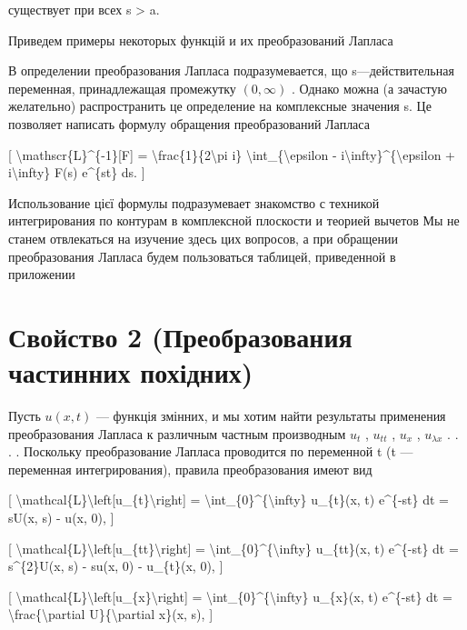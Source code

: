 \documentclass[
]{article}
\begin{document}
существует при всех s \textgreater{} a.

Приведем примеры некоторых функцій и их преобразований Лапласа

В определении преобразования Лапласа подразумевается, що
s---действительная переменная, принадлежащая промежутку \((0, \infty)\)
. Однако можна (а зачастую желательно) распространить це определение на
комплексные значения s. Це позволяет написать формулу обращения
преобразований Лапласа

{[} \textbackslash mathscr\{L\}\^{}\{-1\}{[}F{]} =
\textbackslash frac\{1\}\{2\textbackslash pi i\}
\textbackslash int\_\{\textbackslash epsilon -
i\textbackslash infty\}\^{}\{\textbackslash epsilon +
i\textbackslash infty\} F(s) e\^{}\{st\} ds. {]}

Использование цієї формулы подразумевает знакомство с техникой
интегрирования по контурам в комплексной плоскости и теорией вычетов Мы
не станем отвлекаться на изучение здесь цих вопросов, а при обращении
преобразования Лапласа будем пользоваться таблицей, приведенной в
приложении

\section{Свойство 2 (Преобразования частинних
похідних)}\label{ux441ux432ux43eux439ux441ux442ux432ux43e-2-ux43fux440ux435ux43eux431ux440ux430ux437ux43eux432ux430ux43dux438ux44f-ux447ux430ux441ux442ux438ux43dux43dux438ux445-ux43fux43eux445ux456ux434ux43dux438ux445}

Пусть \(u(x, t)\) --- функція змінних, и мы хотим найти результаты
применения преобразования Лапласа к различным частным производным
\(u_t\) , \(u_{tt}\) , \(u_x\) , \(u_{\lambda x}\) . . . . Поскольку
преобразование Лапласа проводится по переменной t (t --- переменная
интегрирования), правила преобразования имеют вид

{[}
\textbackslash mathcal\{L\}\textbackslash left{[}u\_\{t\}\textbackslash right{]}
= \textbackslash int\_\{0\}\^{}\{\textbackslash infty\} u\_\{t\}(x, t)
e\^{}\{-st\} dt = sU(x, s) - u(x, 0), {]}

{[}
\textbackslash mathcal\{L\}\textbackslash left{[}u\_\{tt\}\textbackslash right{]}
= \textbackslash int\_\{0\}\^{}\{\textbackslash infty\} u\_\{tt\}(x, t)
e\^{}\{-st\} dt = s\^{}\{2\}U(x, s) - su(x, 0) - u\_\{t\}(x, 0), {]}

{[}
\textbackslash mathcal\{L\}\textbackslash left{[}u\_\{x\}\textbackslash right{]}
= \textbackslash int\_\{0\}\^{}\{\textbackslash infty\} u\_\{x\}(x, t)
e\^{}\{-st\} dt = \textbackslash frac\{\textbackslash partial
U\}\{\textbackslash partial x\}(x, s), {]}
\end{document}
